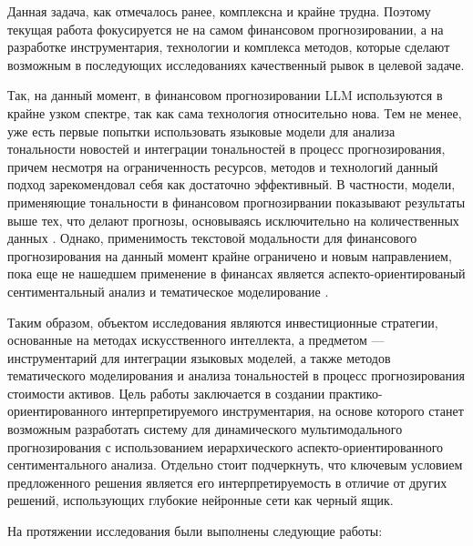 Данная задача, как отмечалось ранее, комплексна и крайне трудна. Поэтому текущая работа фокусируется не на самом финансовом прогнозировании,
а на разработке инструментария, технологии и комплекса методов, которые сделают возможным в последующих исследованиях качественный рывок
в целевой задаче.

Так, на данный момент, в финансовом прогнозировании LLM используются в крайне узком спектре, так как сама технология относительно нова.
Тем не менее, уже есть первые попытки использовать языковые модели для анализа тональности новостей и интеграции тональностей в процесс
прогнозирования, причем несмотря на ограниченность ресурсов, методов и технологий данный подход зарекомендовал себя как достаточно
эффективный. В частности, модели, применяющие тональности в финансовом прогнозирвании показывают результаты выше тех, что делают
прогнозы, основываясь исключительно на количественных данных \parencite{Kim2023, Jiang2023, Halder2022}. Однако, применимость текстовой
модальности для финансового прогнозирования на данный момент крайне ограничено и новым направлением, пока еще не нашедшем применение
в финансах является аспекто-ориентированый сентиментальный анализ \parencite{SA2020taxonomy,FSA2020problems} и тематическое моделирование
\parencite{angelov2020top2vec,BERTopic2022}.

Таким образом, объектом исследования являются инвестиционные стратегии, основанные на методах искусственного интеллекта, а предметом ---
инструментарий для интеграции языковых моделей, а также методов тематического моделирования и анализа тональностей в процесс прогнозирования
стоимости активов. Цель работы заключается в создании практико-ориентированного интерпретируемого инструментария, на основе которого станет
возможным разработать систему для динамического мультимодального прогнозирования с использованием иерархического аспекто-ориентированного
сентиментального анализа. Отдельно стоит подчеркнуть, что ключевым условием предложенного решения является его интерпретируемость
в отличие от других решений, использующих глубокие нейронные сети как черный ящик.

На протяжении исследования были выполнены следующие работы:

